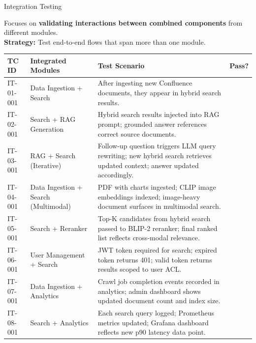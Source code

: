 \documentclass[aspectratio=169,xcolor=dvipsnames]{beamer}
\newcommand{\cmark}{\checkmark}
\newcommand{\tw}{\textwidth}
\begin{document}
\begin{frame}{Integration Testing}
  \begin{block}{}
    Focuses on \textbf{validating interactions between combined components}
    from different modules.\\
    \textbf{Strategy:} Test end-to-end flows that span more than one module.
  \end{block}
  \vspace{.3em}
  \tiny\renewcommand{\arraystretch}{0.88}
  \begin{table}
    \centering
    \begin{tabular}{p{.08\tw}|p{.24\tw}|p{.52\tw}|p{.10\tw}}
      \toprule
      \textbf{TC ID} & \textbf{Integrated Modules} & \textbf{Test Scenario} & \textbf{Pass?}\\
      \midrule
      IT-01-001 & Data Ingestion + Search & After ingesting new Confluence documents, they appear in hybrid search results. & \textcolor{green!60!black}{\cmark}\\
      IT-02-001 & Search + RAG Generation & Hybrid search results injected into RAG prompt; grounded answer references correct source documents. & \textcolor{green!60!black}{\cmark}\\
      IT-03-001 & RAG + Search (Iterative) & Follow-up question triggers LLM query rewriting; new hybrid search retrieves updated context; answer updated accordingly. & \textcolor{green!60!black}{\cmark}\\
      IT-04-001 & Data Ingestion + Search (Multimodal) & PDF with charts ingested; CLIP image embeddings indexed; image-heavy document surfaces in multimodal search. & \textcolor{green!60!black}{\cmark}\\
      IT-05-001 & Search + Reranker & Top-K candidates from hybrid search passed to BLIP-2 reranker; final ranked list reflects cross-modal relevance. & \textcolor{green!60!black}{\cmark}\\
      IT-06-001 & User Management + Search & JWT token required for search; expired token returns 401; valid token returns results scoped to user ACL. & \textcolor{green!60!black}{\cmark}\\
      IT-07-001 & Data Ingestion + Analytics & Crawl job completion events recorded in analytics; admin dashboard shows updated document count and index size. & \textcolor{green!60!black}{\cmark}\\
      IT-08-001 & Search + Analytics & Each search query logged; Prometheus metrics updated; Grafana dashboard reflects new p90 latency data point. & \textcolor{green!60!black}{\cmark}\\

\end{tabular}
\end{table}
\end{frame}
\end{document}
